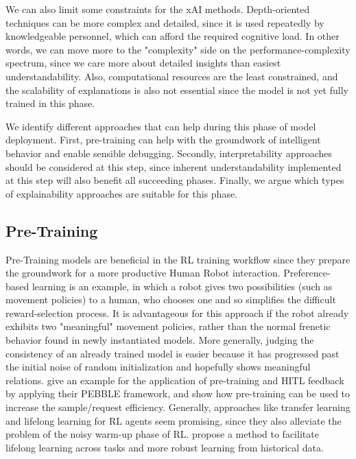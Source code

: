 \documentclass[twoside,11pt]{article}
\begin{document}
We can also limit some constraints for the xAI methods. Depth-oriented techniques can be more complex and detailed, since it is used repeatedly by knowledgeable personnel, which can afford the required cognitive load. In other words, we can move more to the "complexity" side on the performance-complexity spectrum, since we care more about detailed insights than easiest understandability. Also, computational resources are the least constrained, and the scalability of explanations is also not essential since the model is not yet fully trained in this phase.

We identify different approaches that can help during this phase of model deployment. First, pre-training can help with the groundwork of intelligent behavior and enable sensible debugging. Secondly, interpretability approaches should be considered at this step, since inherent understandability implemented at this step will also benefit all succeeding phases. Finally, we argue which types of explainability approaches are suitable for this phase.

\subsection{Pre-Training}

Pre-Training models are beneficial in the RL training workflow since they prepare the groundwork for a more productive Human Robot interaction.
Preference-based learning is an example, in which a robot gives two possibilities (such as movement policies) to a human, who chooses one and so simplifies the difficult reward-selection process. It is advantageous for this approach if the robot already exhibits two "meaningful" movement policies, rather than the normal frenetic behavior found in newly instantiated models.
More generally, judging the consistency of an already trained model is easier because it has progressed past the initial noise of random initialization and hopefully shows meaningful relations. \cite{LeeSmithAbbeel:2021:FeedbackPreferenceHITLLearningPEBBLE} give an example for the application of pre-training and HITL feedback by applying their PEBBLE framework, and show how pre-training can be used to increase the sample/request efficiency.
Generally, approaches like transfer learning and lifelong learning for RL agents seem promising, since they also alleviate the problem of the noisy warm-up phase of RL. \citet{AzarLazaricBrunskill:2013:LifelongLearning} propose a method to facilitate lifelong learning across tasks and more robust learning from historical data.
\end{document}

